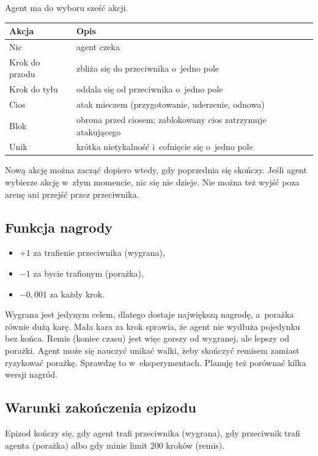 \documentclass[12pt]{article}
\begin{document}
Agent ma do wyboru sześć akcji.

\begin{center}
\begin{tabular}{p{}p{}}
\toprule
Akcja & Opis \\
\midrule
Nic & agent czeka \\
Krok do przodu & zbliża się do przeciwnika o~jedno pole \\
Krok do tyłu & oddala się od przeciwnika o~jedno pole \\
Cios & atak mieczem (przygotowanie, uderzenie, odnowa) \\
Blok & obrona przed ciosem; zablokowany cios zatrzymuje atakującego \\
Unik & krótka nietykalność i~cofnięcie się o~jedno pole \\
\bottomrule
\end{tabular}
\end{center}

Nową akcję można zacząć dopiero wtedy, gdy poprzednia się skończy. Jeśli agent wybierze akcję w~złym momencie, nic się nie dzieje. Nie można też wyjść poza arenę ani przejść przez przeciwnika.

\subsection{Funkcja nagrody}

\begin{itemize}
    \item $+1$ za trafienie przeciwnika (wygrana),
    \item $-1$ za bycie trafionym (porażka),
    \item $-0{,}001$ za każdy krok.
\end{itemize}

Wygrana jest jedynym celem, dlatego dostaje największą nagrodę, a~porażka równie dużą karę. Mała kara za krok sprawia, że agent nie wydłuża pojedynku bez końca. Remis (koniec czasu) jest więc gorszy od wygranej, ale lepszy od porażki. Agent może się nauczyć unikać walki, żeby skończyć remisem zamiast ryzykować porażkę. Sprawdzę to w~eksperymentach. Planuję też porównać kilka wersji nagród.

\subsection{Warunki zakończenia epizodu}

Epizod kończy się, gdy agent trafi przeciwnika (wygrana), gdy przeciwnik trafi agenta (porażka) albo gdy minie limit 200 kroków (remis).
\end{document}
